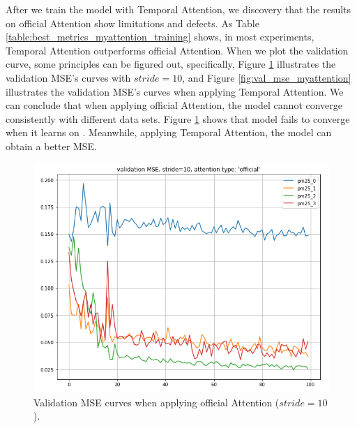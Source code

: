 \documentclass[sigconf]{acmart}
\begin{document}
After we train the model with Temporal Attention, we discovery that the results on official Attention show limitations and defects. As Table \ref{table:best_metrics_myattention_training} shows, in most experiments, Temporal Attention outperforms official Attention. When we plot the validation curve, some principles can be figured out, specifically, Figure \ref{fig:val_mse_official} illustrates the validation MSE's curves with $stride=10$, and Figure \ref{fig:val_mse_myattention} illustrates the validation MSE's curves when applying Temporal Attention. We can conclude that when applying official Attention, the model cannot converge consistently with different data sets. Figure \ref{fig:val_mse_official} shows that model fails to converge when it learns on . Meanwhile, applying Temporal Attention, the model can obtain a better MSE.

\begin{figure}[!htbp]
    \centering
    \includegraphics[width=0.8\linewidth]{fig/results/validation/val_mse_official.png}
    \caption{Validation MSE curves when applying official Attention ($stride=10$).}
    \label{fig:val_mse_official}
\end{figure}
\end{document}
